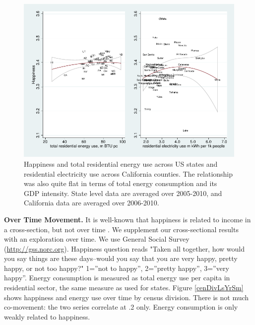 \documentclass[10pt, letterpaper]{article}
\begin{document}
\begin{spacing}{1.0}
\begin{figure}[H]
 \includegraphics[width=6in]{graphsAndTables/stateCa.pdf}\centering
\caption{Happiness and total residential energy use across US states and
  residential electricity use across   
  California counties.  %
 The relationship was also quite flat in terms of total energy consumption and
 its GDP intensity. State level data are averaged over 2005-2010, and California data are averaged over 2006-2010.
}\label{stateCaPAP}
 \end{figure} %

{\bf Over Time Movement.} It is well-known that happiness is related to income
in  a 
cross-section, but not over time \citep{easterlin74,easterlin12}. We
supplement our cross-sectional results with an exploration over time. We use General
Social Survey (\url{http://gss.norc.org}).   %
Happiness question reads "Taken all together, how would you say things are
      these days--would you say that you are very happy, pretty happy, or not
      too happy?" 1=''not to happy'', 2=''pretty happy'', 3=''very happy''. 
 Energy consumption is measured as total energy use per capita in
residential sector, the same measure as used for states. 
Figure \ref{cenDivLsYrSm} shows happiness and energy use over time by
census division. There is not much co-movement: the two series correlate at
.2 only. Energy consumption is only weakly related to happiness. 


\end{spacing}
\end{document}
